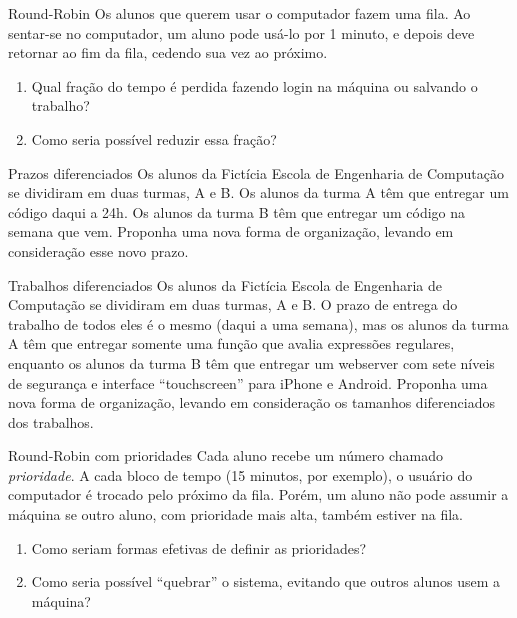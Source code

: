 \documentclass{beamer}
\begin{document}
\begin{frame}[fragile]{Round-Robin}
  \centering
  \large
  Os alunos que querem usar o computador fazem uma fila. Ao sentar-se no
  computador, um aluno pode usá-lo por 1 minuto, e depois deve retornar ao fim
  da fila, cedendo sua vez ao próximo.
  \begin{enumerate}
  \item Qual fração do tempo é perdida fazendo login na máquina ou salvando
      o trabalho?
  \item Como seria possível reduzir essa fração?
  \end{enumerate}
\end{frame}

\begin{frame}[fragile]{Prazos diferenciados}
  \centering
  \large
  Os alunos da Fictícia Escola de Engenharia de Computação se dividiram em duas
  turmas, A e B. Os alunos da turma A têm que entregar um código daqui a 24h. Os
  alunos da turma B têm que entregar um código na semana que vem. Proponha uma
  nova forma de organização, levando em consideração esse novo prazo.
\end{frame}

\begin{frame}[fragile]{Trabalhos diferenciados}
  \centering
  \large
  Os alunos da Fictícia Escola de Engenharia de Computação se dividiram em duas
  turmas, A e B. O prazo de entrega do trabalho de todos eles é o mesmo (daqui a
  uma semana), mas os alunos da turma A têm que entregar somente uma função que
  avalia expressões regulares, enquanto os alunos da turma B têm que entregar um
  webserver com sete níveis de segurança e interface ``touchscreen'' para iPhone
  e Android. Proponha uma nova forma de organização, levando em consideração os
  tamanhos diferenciados dos trabalhos.
\end{frame}

\begin{frame}[fragile]{Round-Robin com prioridades}
  \centering
  \large
  Cada aluno recebe um número chamado \textit{prioridade}. A cada bloco de tempo
  (15 minutos, por exemplo), o usuário do computador é trocado pelo próximo da
  fila. Porém, um aluno não pode assumir a máquina se outro aluno, com
  prioridade mais alta, também estiver na fila.
  \begin{enumerate}
    \item Como seriam formas efetivas de definir as prioridades?
    \item Como seria possível ``quebrar'' o sistema, evitando que outros alunos
      usem a máquina?
  \end{enumerate}
\end{frame}
\end{document}
